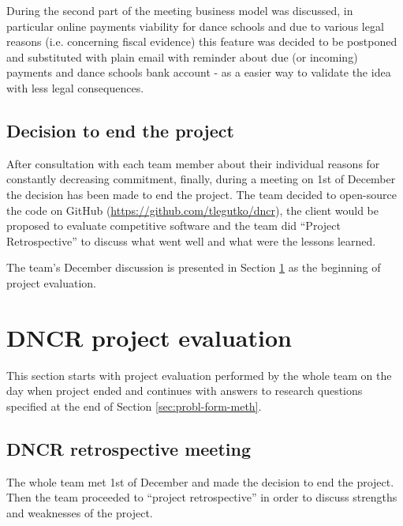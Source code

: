 \documentclass{article}
\begin{document}
During the second part of the meeting business model was discussed, in particular online payments viability for dance schools and due to various legal reasons (i.e. concerning fiscal evidence) this feature was decided to be postponed and substituted with plain email with reminder about due (or incoming) payments and dance schools bank account - as a easier way to validate the idea with less legal consequences.

\subsection{Decision to end the project}
After consultation with each team member about their individual reasons for constantly decreasing commitment, finally, during a meeting on 1st of December the decision has been made to end the project. The team decided to open-source the code on GitHub (\url{https://github.com/tlegutko/dncr}), the client would be proposed to evaluate competitive software and the team did ``Project Retrospective'' to discuss what went well and what were the lessons learned.

The team's December discussion is presented in Section \ref{sec:dncr-proj-eval} as the beginning of project evaluation.

\section{DNCR project evaluation}
\label{sec:dncr-proj-eval}
This section starts with project evaluation performed by the whole team on the day when project ended and continues with answers to research questions specified at the end of Section \ref{sec:probl-form-meth}.

\subsection{DNCR retrospective meeting}
The whole team met 1st of December and made the decision to end the project. Then the team proceeded to ``project retrospective'' in order to discuss strengths and weaknesses of the project.
\end{document}

